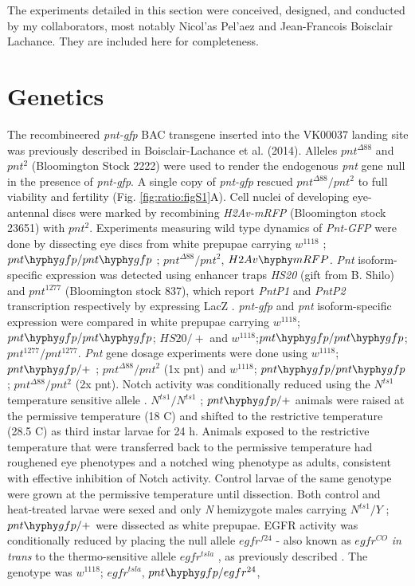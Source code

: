\graphicspath{ {./figures/ratio/} }


The experiments detailed in this section were conceived, designed, and conducted by my collaborators, most notably Nicol'{a}s Pel'{a}ez and Jean-Francois Boisclair Lachance. They are included here for completeness.

\section{Genetics}
\label{appendix:ratio:genetics}

The recombineered \textit{pnt-gfp} BAC transgene inserted into the VK00037 landing site was previously described in Boisclair-Lachance et al. (2014). Alleles $pnt^{\Delta 88}$ \cite{ONeill1994a} and $pnt^2$ (Bloomington Stock 2222) were used to render the endogenous \textit{pnt} gene null in the presence of \textit{pnt-gfp}. A single copy of \textit{pnt-gfp} rescued $pnt^{\Delta 88}/pnt^2$ to full viability and fertility (Fig. \ref{fig:ratio:figS1}A). Cell nuclei of developing eye-antennal discs were marked by recombining \textit{H2Av-mRFP} (Bloomington stock 23651) with $pnt^2$. Experiments measuring wild type dynamics of \textit{Pnt-GFP} were done by dissecting eye discs from white prepupae carrying $w^{1118}$ ; $pnt\hyphy gfp / pnt\hyphy gfp$ ; $pnt^{\Delta 88}/pnt^2$, $H2Av\hyphy mRFP$. \textit{Pnt} isoform-specific expression was detected using enhancer traps \textit{HS20} (gift from B. Shilo) and $pnt^{1277}$ (Bloomington stock 837), which report \textit{PntP1} and \textit{PntP2} transcription respectively by expressing LacZ \cite{Scholz1993}. \textit{pnt-gfp} and \textit{pnt} isoform-specific expression were compared in white prepupae carrying $w^{1118}$; $pnt\hyphy gfp/pnt\hyphy gfp$; $HS20/+$ and $w^{1118}$;$pnt\hyphy gfp/pnt\hyphy gfp$; $pnt^{1277}/pnt^{1277}$. \textit{Pnt} gene dosage experiments were done using $w^{1118}$; $pnt\hyphy gfp/+$ ; $pnt^{\Delta 88}/pnt^2$ (1x pnt) and $w^{1118}$; $pnt\hyphy gfp/pnt\hyphy gfp$ ; $pnt^{\Delta 88}/pnt^2$ (2x pnt). Notch activity was conditionally reduced using the $N^{ts1}$ temperature sensitive allele \cite{Shellenbarger1975}. $N^{ts1}/N^{ts1}$ ; $pnt\hyphy gfp/+$ animals were raised at the permissive temperature (18 \textdegree{}C) and shifted to the restrictive temperature (28.5 \textdegree{}C) as third instar larvae for 24 h. Animals exposed to the restrictive temperature that were transferred back to the permissive temperature had roughened eye phenotypes and a notched wing phenotype as adults, consistent with effective inhibition of Notch activity. Control larvae of the same genotype were grown at the permissive temperature until dissection. Both control and heat-treated larvae were sexed and only \textit{N} hemizygote males carrying $N^{ts1}/Y$ ; $pnt\hyphy gfp/+$ were dissected as white prepupae. EGFR activity was conditionally reduced by placing the null allele $egfr^{f24}$ - also known as $egfr^{CO}$ \cite{Clifford1989} \textit{in trans} to the thermo-sensitive allele $egfr^{tsla}$ \cite{Kumar1998}, as previously described \cite{Pelaez2015a}. The genotype was $w^{1118}$; $egfr^{tsla}$, $pnt\hyphy gfp/egfr^{24}$, 
